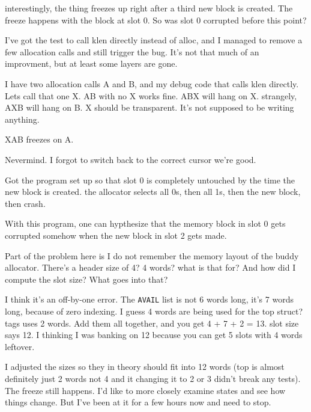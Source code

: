 interestingly, the thing freezes up right after a third new block is created. The freeze happens with the block at slot 0. So was slot 0 corrupted before this point?
\par

I've got the test to call klen directly instead of alloc, and I managed to remove a few allocation calls and still trigger the bug. It's not that much of an improvment, but at least some layers are gone.
\par

I have two allocation calls A and B, and my debug code that calls klen directly. Lets call that one X. AB with no X works fine. ABX will hang on X. strangely, AXB will hang on B. X should be transparent. It's not supposed to be writing anything.
\par

XAB freezes on A.
\par

Nevermind. I forgot to switch back to the correct cursor we're good.
\par

Got the program set up so that slot 0 is completely untouched by the time the new block is created. the allocator selects all 0s, then all 1s, then the new block, then crash.
\par

With this program, one can hypthesize that the memory block in slot 0 gets corrupted somehow when the new block in slot 2 gets made.
\par

Part of the problem here is I do not remember the memory layout of the buddy allocator. There's a header size of 4? 4 words? what is that for? And how did I compute the slot size? What goes into that?
\par

I think it's an off-by-one error. The {\tt AVAIL} list is not 6 words long, it's 7 words long, because of zero indexing. I guess 4 words are being used for the top struct? tags uses 2 words. Add them all together, and you get 4 + 7 + 2 = 13. slot size says 12. I thinking I was banking on 12 because you can get 5 slots with 4 words leftover.
\par

I adjusted the sizes so they in theory should fit into 12 words (top is almost definitely just 2 words not 4 and it changing it to 2 or 3 didn't break any tests). The freeze still happens. I'd like to more closely examine states and see how things change. But I've been at it for a few hours now and need to stop.
\par

